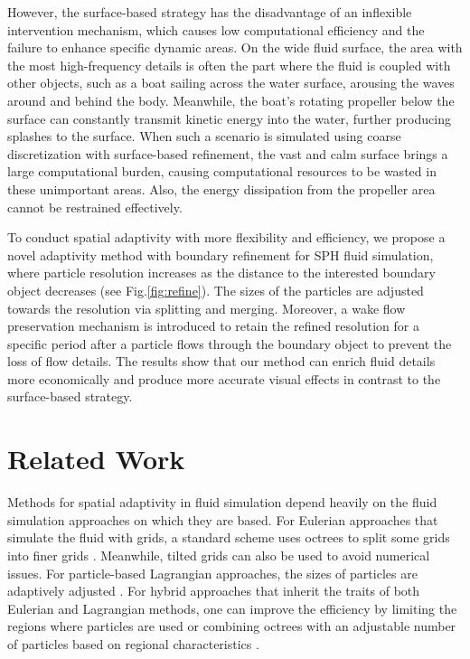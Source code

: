 \documentclass[VANCOUVER,STIX1COL]{WileyNJD-v2}
\begin{document}
However, the surface-based strategy has the disadvantage of an inflexible intervention mechanism, which causes low computational efficiency and the failure to enhance specific dynamic areas. On the wide fluid surface, the area with the most high-frequency details is often the part where the fluid is coupled with other objects, such as a boat sailing across the water surface, arousing the waves around and behind the body. Meanwhile, the boat's rotating propeller below the surface can constantly transmit kinetic energy into the water, further producing splashes to the surface. When such a scenario is simulated using coarse discretization with surface-based refinement, the vast and calm surface brings a large computational burden, causing computational resources to be wasted in these unimportant areas. Also, the energy dissipation from the propeller area cannot be restrained effectively. 

To conduct spatial adaptivity with more flexibility and efficiency, we propose a novel adaptivity method with boundary refinement for SPH fluid simulation, where particle resolution increases as the distance to the interested boundary object decreases (see Fig.\ref{fig:refine}). The sizes of the particles are adjusted towards the resolution via splitting and merging. Moreover, a wake flow preservation mechanism is introduced to retain the refined resolution for a specific period after a particle flows through the boundary object to prevent the loss of flow details. The results show that our method can enrich fluid details more economically and produce more accurate visual effects in contrast to the surface-based strategy.

\section{Related Work}
Methods for spatial adaptivity in fluid simulation depend heavily on the fluid simulation approaches on which they are based. For Eulerian approaches that simulate the fluid with grids, a standard scheme uses octrees to split some grids into finer grids \cite{Ando20}. Meanwhile, tilted grids can also be used \cite{Xiao20} to avoid numerical issues. For particle-based Lagrangian approaches, the sizes of particles are adaptively adjusted \cite{Winchenbach17}. For hybrid approaches that inherit the traits of both Eulerian and Lagrangian methods, one can improve the efficiency by limiting the regions where particles are used \cite{Sato18} or combining octrees with an adjustable number of particles based on regional characteristics \cite{Nakanishi20}.
\end{document}
